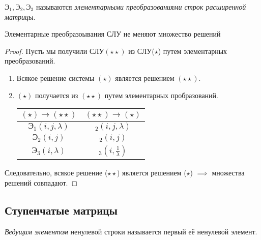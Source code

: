 $\text{Э}_1, \text{Э}_2, \text{Э}_3$ называются \textit{элементарными преобразованиями строк расширенной матрицы}.

\begin{lemma}
    Элементарные преобразоывания СЛУ не меняют множество решений
\end{lemma}

\begin{proof}
    Пусть мы получили СЛУ$(\star\star)$ из СЛУ($\star$) путем элементарных преобразований.

    \begin{enumerate}
    \item
        Всякое решение системы $(\star)$ является решением $(\star\star)$.
    \item
        $(\star)$ получается из $(\star\star)$ путем элементарных пробразований.

        \begin{tabular}{c|c|}
            $(\star) \to (\star\star)$ & $(\star\star) \to (\star)$ \\
            \hline
            $\text{Э}_1(i, j, \lambda)$ & $\text{}_2(i, j, \lambda)$ \\
            $\text{Э}_2(i, j)$ & $\text{}_2(i, j)$ \\
            $\text{Э}_3(i, \lambda)$ & $\text{}_3(i, \frac{1}{\lambda})$
        \end{tabular}
    \end{enumerate} 

    Следовательно, всякое решение ($\star\star$) является решением ($\star$) $\implies$ множества решений совпадают.
\end{proof}

\subsection{Ступенчатые матрицы}

\begin{definition}
    \textit{Ведущим элементом} ненулевой строки называется первый её ненулевой элемент.
\end{definition}

